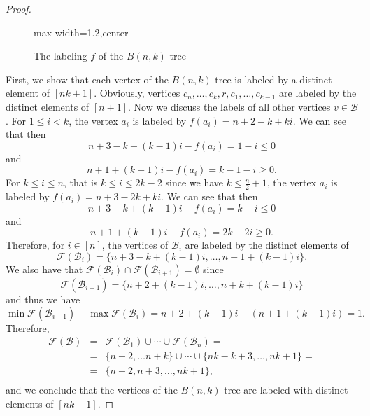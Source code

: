 \documentclass[10pt]{article}
\theoremstyle{definition}
\begin{document}
\begin{proof}
\begin{figure}[H]
\begin{adjustbox}{max width=1.2\textwidth,center}
\begin{tikzpicture}[scale=1.25, every node/.style={circle, draw, fill=black, inner sep=1.5pt}]
      \end{tikzpicture}
    \end{adjustbox}
    \caption{The labeling $f$ of the $B(n, k)$ tree}
    \label{fig:B(n,k)2}
  \end{figure}
  First, we show that each vertex of the $B(n, k)$ tree is labeled by a distinct element of $[nk + 1]$.
  Obviously, vertices $c_n, \ldots, c_k, r, c_1, \ldots, c_{k-1}$ are labeled by the distinct elements of $[n + 1]$. Now we discuss the labels of all other vertices $v \in \mathcal{B}$.
  For $1 \le i < k$, the vertex $a_i$ is labeled by $f(a_i) = n + 2 -k + ki$. We can see that then
  $$
  n + 3 -k + (k - 1) i - f(a_i) = 1-i \le 0
  $$
  and
  $$
  n+1 + (k-1)i  - f(a_i) = k-1-i \ge 0.
  $$
  For $k \leq i \leq n$, that is $k \leq i \leq 2k - 2$ since we have $k \leq \frac{n}{2} + 1$,  the vertex $a_i$ is labeled by $f(a_i) = n + 3 - 2k + ki$. We can see that then
  $$
  n + 3 -k + (k - 1) i - f(a_i) = k - i \le 0
  $$
  and
  $$
  n+1 + (k-1)i  - f(a_i) = 2k -2 i \ge 0.
  $$
  Therefore, for $i \in [n]$, the vertices of $\mathcal{B}_i$ are labeled by the distinct elements of
  $$
  \mathcal{F}(\mathcal{B}_i) = \{n + 3 -k + (k - 1) i, \dots, n + 1 + (k - 1) i\}.
  $$
  We also have that $\mathcal{F}(\mathcal{B}_i) \cap \mathcal{F}(\mathcal{B}_{i + 1}) = \emptyset$ since
  \begin{equation}\label{lab_bi2}
    \mathcal{F}(\mathcal{B}_{i + 1}) = \{n + 2 + (k - 1) i, \ldots, n + k + (k - 1) i\}
  \end{equation}
  and thus we have
  $$
  \min{\mathcal{F}(\mathcal{B}_{i + 1})} - \max{\mathcal{F}(\mathcal{B}_{i})} = n + 2 + (k - 1) i - ( n + 1 + (k - 1) i) = 1.
  $$
  Therefore,
  \begin{equation}\label{lab_b2}
    \begin{array}{lcl}
      \mathcal{F}(\mathcal{B}) & = & \mathcal{F}(\mathcal{B}_1) \cup \cdots \cup \mathcal{F}(\mathcal{B}_{n}) = \\ & = &
      \{n+2, \ldots n+k\} \cup \cdots \cup \{nk-k+3, \ldots , nk+1\} = \\
      & = & \{ n + 2, n + 3, \dots, nk + 1\},\\
    \end{array}
  \end{equation}
  and we conclude that the vertices of the $B(n,k)$ tree are labeled with distinct elements of $[nk + 1]$.


\end{proof}
\end{document}
